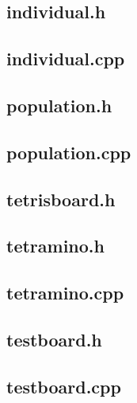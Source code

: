 \documentclass[a4paper,12pt]{article}
\begin{document}
\clearpage
\subsection{individual.h}


\subsection{individual.cpp}


\clearpage
\subsection{population.h}


\subsection{population.cpp}


\clearpage
\subsection{tetrisboard.h}


\clearpage
\subsection{tetramino.h}


\subsection{tetramino.cpp}


\clearpage
\subsection{testboard.h}


\subsection{testboard.cpp}

\end{document}

